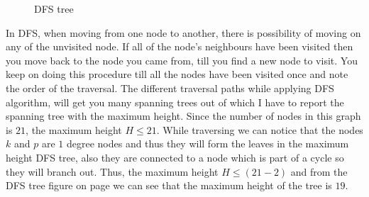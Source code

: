 \documentclass{article}
\begin{document}
{\begin{figure}[h]
\begin{minipage}[h]{0.2\textwidth}
      \caption{DFS tree}
      \label{fig:spantree}
    \end{minipage}
 \end{figure}
 \newpage
 \noindent In DFS, when moving from one node to another, there is possibility of moving on any of the unvisited node.
 \newline If all of the node's neighbours have been visited then you move back to the node you came from, till you find a new node to visit. You keep on doing this procedure till all the nodes have been visited once and note the order of the traversal.
 \newline The different traversal paths while applying DFS algorithm, will get you many spanning trees out of which I have to report the spanning tree with the maximum height.
 \newline Since the number of nodes in this graph is $21$, the maximum height $H \leq 21$.
 \newline While traversing we can notice that the nodes $k$ and $p$ are $1$ degree nodes and thus they will form the leaves in the maximum height DFS tree, also they are connected to a node which is part of a cycle so they will branch out.
 \newline Thus, the maximum height $H \leq (21-2)$ and from the DFS tree figure on page \pageref{fig:spantree} we can see that the maximum height of the tree is $19$.
}
\newpage
\end{document}
